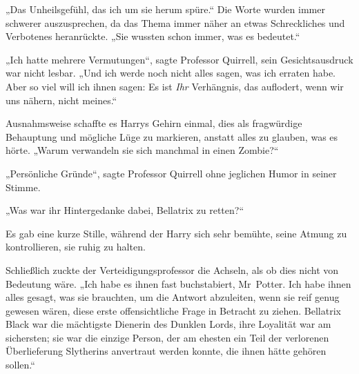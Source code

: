 „Das Unheilsgefühl, das ich um sie herum spüre.“ Die Worte wurden immer schwerer auszusprechen, da das Thema immer näher an etwas Schreckliches und Verbotenes heranrückte.
„Sie wussten schon immer, was es bedeutet.“

„Ich hatte mehrere Vermutungen“, sagte Professor Quirrell, sein Gesichtsausdruck war nicht lesbar.
„Und ich werde noch nicht alles sagen, was ich erraten habe. Aber so viel will ich ihnen sagen: Es ist \emph{Ihr} Verhängnis, das auflodert, wenn wir uns nähern, nicht meines.“

Ausnahmsweise schaffte es Harrys Gehirn einmal, dies als fragwürdige Behauptung und mögliche Lüge zu markieren, anstatt alles zu glauben, was es hörte.
„Warum verwandeln sie sich manchmal in einen Zombie?“

„Persönliche Gründe“, sagte Professor Quirrell ohne jeglichen Humor in seiner Stimme.

„Was war ihr Hintergedanke dabei, Bellatrix zu retten?“

Es gab eine kurze Stille, während der Harry sich sehr bemühte, seine Atmung zu kontrollieren, sie ruhig zu halten.

Schließlich zuckte der Verteidigungsprofessor die Achseln, als ob dies nicht von Bedeutung wäre.
„Ich habe es ihnen fast buchstabiert, Mr~Potter. Ich habe ihnen alles gesagt, was sie brauchten, um die Antwort abzuleiten, wenn sie reif genug gewesen wären, diese erste offensichtliche Frage in Betracht zu ziehen. Bellatrix Black war die mächtigste Dienerin des Dunklen Lords, ihre Loyalität war am sichersten; sie war die einzige Person, der am ehesten ein Teil der verlorenen Überlieferung Slytherins anvertraut werden konnte, die ihnen hätte gehören sollen.“

